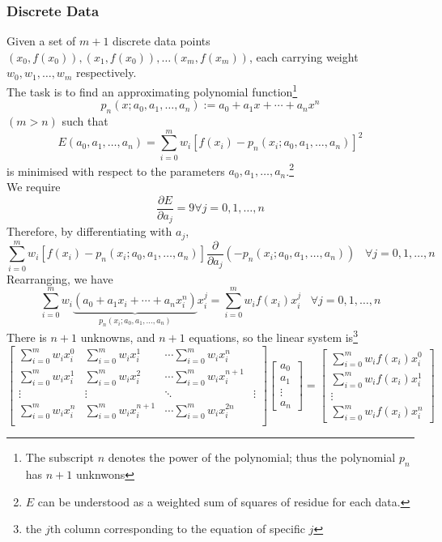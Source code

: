 \documentclass[12pt]{article}
\theoremstyle{definition}
\begin{document}
\subsubsection{Discrete Data}
Given a set of $m+1$ discrete data points $(x_0,f(x_0)), (x_1,f(x_0)),\ldots (x_m,f(x_m))$, each carrying weight $w_0,w_1,\ldots, w_m$ respectively. \\
The task is to find an approximating polynomial function\footnote{The subscript $n$ denotes the power of the polynomial; thus the polynomial $p_n$ has $n+1$ unknwons}
\[
p_n(x;a_0,a_1,\ldots, a_n):=a_0+a_1x+\cdots+a_nx^n
\] 
$(m>n)$ such that
\[
E(a_0,a_1,\ldots, a_n)=\sum_{i=0}^m w_i[f(x_i)-p_n(x_i; a_0,a_1,\ldots, a_n)]^2
\]
is minimised with respect to the parameters $a_0, a_1,\ldots, a_n$.\footnote{$E$ can be understood as a weighted sum of squares of residue for each data.}\\
We require
\[
\frac{\partial E}{\partial a_j} = 9 \forall j = 0,1,\ldots, n
\]
Therefore, by differentiating with $a_j$,
\[
\sum_{i=0}^m w_i[f(x_i)-p_n(x_i; a_0,a_1,\ldots, a_n)]\frac{\partial}{\partial a_j}\left(-p_n(x_i;a_0,a_1,\ldots, a_n)\right)\;\;\;\forall j = 0,1,\ldots, n
\]
Rearranging, we have
\[
\sum_{i=0}^mw_i\underbrace{(a_0+a_1x_i+\cdots+a_nx_i^n)}_{p_n(x_i; a_0,a_1,\ldots, a_n)}x_i^j   =\sum_{i=0}^m w_if(x_i)x_i^j\;\;\;\forall j = 0,1,\ldots, n
\]
There is $n+1$ unknowns, and $n+1$ equations, so the linear system is\footnote{the $j$th column corresponding to the equation of specific $j$}
\[
\begin{bmatrix}
\sum_{i=0}^m w_ix_i^0&\sum_{i=0}^m w_ix_i^1&\cdots \sum_{i=0}^m w_ix_i^n\\
\sum_{i=0}^m w_ix_i^1&\sum_{i=0}^m w_ix_i^2&\cdots \sum_{i=0}^m w_ix_i^{n+1}\\
\vdots&\vdots&\ddots&\vdots\\
\sum_{i=0}^m w_ix_i^n&\sum_{i=0}^m w_ix_i^{n+1}&\cdots \sum_{i=0}^m w_ix_i^{2n}\\
\end{bmatrix}\begin{bmatrix}
a_0\\a_1\\\vdots\\a_n\end{bmatrix}=\begin{bmatrix}
\sum_{i=0}^m w_if(x_i)x_i^0\\\sum_{i=0}^m w_if(x_i)x_i^1\\\vdots\\\sum_{i=0}^m w_if(x_i)x_i^n\end{bmatrix}
\]
\end{document}
